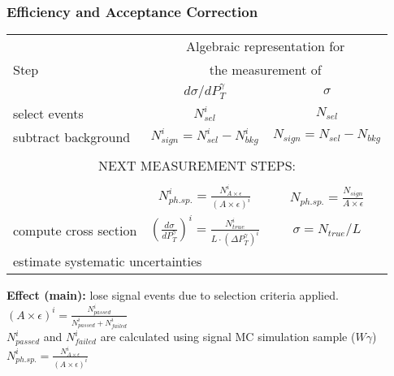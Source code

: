 \begin{frame}\frametitle{Efficiency and Acceptance Correction}

\begin{table}[h]
  \tiny
  \begin{center}
  \begin{tabular}{|l|c|c|}
    \hline
          & \multicolumn{2}{|c|}{Algebraic representation for} \\ 
     Step & \multicolumn{2}{|c|}{the measurement of} \\ 
          & $d\sigma/dP_{T}^{\gamma}$ & $\sigma$ \\ \hline
    select events & {\bfseries{$N_{sel}^i$}} &    {\bfseries{$N_{sel}$}}       \\ \hline
    subtract background & {\bfseries{$N_{sign}^i = N_{sel}^i - N_{bkg}^i$}} &    {\bfseries{$N_{sign}=N_{sel}-N_{bkg}$}}       \\ \hline
    \multicolumn{3}{|c|}{ } \\  
    \multicolumn{3}{|c|}{NEXT MEASUREMENT STEPS:} \\  
    \multicolumn{3}{|c|}{ } \\ \hline 
    {\bfseries\color{blue}{correct for eff X acc}} & {\color{blue}$N_{ph.sp.}^i = \frac{N_{A\times\epsilon}^i}{(A \times\epsilon)^i}$} &  {\color{blue}$N_{ph.sp.}=\frac{N_{sign}}{A\times\epsilon}$}       \\ \hline
    compute cross section & $ \left( \frac{d\sigma}{dP_{T}^\gamma} \right) ^i = \frac{N_{true}^i}{L \cdot (\Delta P_T^\gamma)^i}$  &  $\sigma = N_{true}/L$       \\ \hline
    \multicolumn{3}{|l|}{estimate systematic uncertainties }         \\ \hline
  \end{tabular}
  \label{tab:analysisOutline}
  \end{center}
\end{table}

\footnotesize
{\bfseries{Effect (main):}} lose signal events due to selection criteria applied.\\

\scriptsize
$(A\times\epsilon)^i = \frac{N_{passed}^i}{N_{passed}^i+N_{failed}^i}$\\
{\tiny{$N_{passed}^i$ and $N_{failed}^i$ are calculated using signal MC simulation sample ($W\gamma$)}}\\

$N_{ph.sp.}^i = \frac{N_{A\times\epsilon}^i}{(A \times\epsilon)^i}$

\end{frame}%

